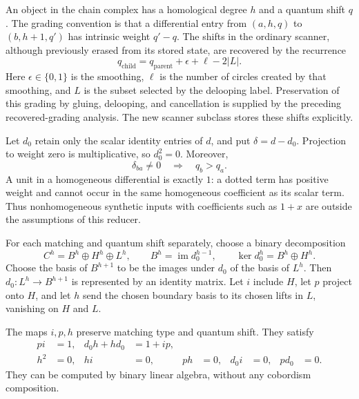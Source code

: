 An object in the chain complex has a homological degree $h$ and a quantum
shift $q$.  The grading convention is that a differential entry from
$(a,h,q)$ to $(b,h+1,q')$ has intrinsic weight $q'-q$.  The shifts in the
ordinary scanner, although previously erased from its stored state, are
recovered by the recurrence
\begin{equation}\label{eq:corridor-q-recurrence}
 q_{\mathrm{child}}=q_{\mathrm{parent}}+\epsilon+\ell-2|L|.
\end{equation}
Here $\epsilon\in\{0,1\}$ is the smoothing, $\ell$ is the number of circles
created by that smoothing, and $L$ is the subset selected by the delooping
label.  Preservation of this grading by gluing, delooping, and cancellation
is supplied by the preceding recovered-grading analysis.  The new scanner
subclass stores these shifts explicitly.

Let $d_0$ retain only the scalar identity entries of $d$, and put
$\delta=d-d_0$.  Projection to weight zero is multiplicative, so $d_0^2=0$.
Moreover,
\begin{equation}\label{eq:corridor-positive-delta}
 \delta_{ba}\ne0\quad\Longrightarrow\quad q_b>q_a.
\end{equation}
A unit in a homogeneous differential is exactly $1$: a dotted term has
positive weight and cannot occur in the same homogeneous coefficient as its
scalar term.  Thus nonhomogeneous synthetic inputs with coefficients such as
$1+x$ are outside the assumptions of this reducer.

For each matching and quantum shift separately, choose a binary decomposition
\begin{equation}\label{eq:corridor-bhl}
 C^h=B^h\oplus H^h\oplus L^h,
 \qquad B^h=\operatorname{im}d_0^{h-1},\qquad
 \ker d_0^h=B^h\oplus H^h.
\end{equation}
Choose the basis of $B^{h+1}$ to be the images under $d_0$ of the basis of
$L^h$.  Then $d_0:L^h\to B^{h+1}$ is represented by an identity matrix.
Let $i$ include $H$, let $p$ project onto $H$, and let $h$ send the chosen
boundary basis to its chosen lifts in $L$, vanishing on $H$ and $L$.

\begin{lemma}\label{lem:corridor-binary}
The maps $i,p,h$ preserve matching type and quantum shift.  They satisfy
\begin{align}
 pi&=1,&d_0h+hd_0&=1+ip,\label{eq:corridor-scalar-main}\\
 h^2&=0,&hi&=0,&ph&=0,&d_0i&=0,&pd_0&=0.
 \label{eq:corridor-scalar-side}
\end{align}
They can be computed by binary linear algebra, without any cobordism
composition.
\end{lemma}

